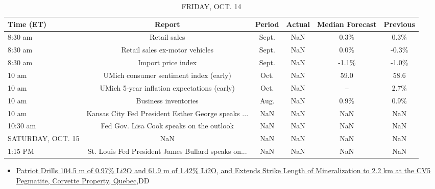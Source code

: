 \documentclass{article}%
\begin{document}
%


\begin{table}[htbp]%
\caption{FRIDAY, OCT. 14}%
\centering%
\begin{adjustbox}{width=1\textwidth}%
\begin{tabular}{lccccc}
\toprule
        Time (ET) &                                             Report & Period & Actual & Median Forecast & Previous \\
\midrule
          8:30 am &                                       Retail sales &  Sept. &    NaN &            0.3\% &     0.3\% \\
          8:30 am &                     Retail sales ex-motor vehicles &  Sept. &    NaN &            0.0\% &    -0.3\% \\
          8:30 am &                                 Import price index &  Sept. &    NaN &           -1.1\% &    -1.0\% \\
            10 am &             UMich consumer sentiment index (early) &   Oct. &    NaN &            59.0 &     58.6 \\
            10 am &        UMich 5-year inflation expectations (early) &   Oct. &    NaN &              -- &     2.7\% \\
            10 am &                               Business inventories &   Aug. &    NaN &            0.9\% &     0.9\% \\
            10 am & Kansas City Fed President Esther George speaks ... &    NaN &    NaN &             NaN &      NaN \\
         10:30 am &           Fed Gov. Lisa Cook speaks on the outlook &    NaN &    NaN &             NaN &      NaN \\
SATURDAY, OCT. 15 &                                                NaN &    NaN &    NaN &             NaN &      NaN \\
          1:15 PM & St. Louis Fed President James Bullard speaks on... &    NaN &    NaN &             NaN &      NaN \\
\bottomrule
\end{tabular}
%
\end{adjustbox}%
\end{table}

%
\begin{itemize}%
\item%
\href{https://reddit.com/r/Baystreetbets/comments/y22co4/patriot\_drills\_1045\_m\_of\_097\_li2o\_and\_619\_m\_of/}{Patriot Drills 104.5 m of 0.97\% Li2O and 61.9 m of 1.42\% Li2O, and Extends Strike Length of Mineralization to 2.2 km at the CV5 Pegmatite, Corvette Property, Quebec},DD%
\end{itemize}%
\end{document}
